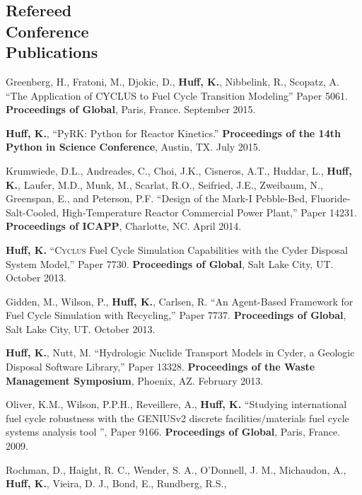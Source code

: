 \documentclass[margin,line]{resume}
\newcommand{\Cyclus}{\textsc{Cyclus}\xspace}%
\begin{document}
\begin{resume}
    \section{\mysidestyle Refereed\\Conference\\Publications}
    \begin{bibenum}
      \item Greenberg, H., Fratoni, M., Djokic, D., \textbf{Huff, K.},
         Nibbelink, R., Scopatz, A. ``The Application of CYCLUS to Fuel Cycle
         Transition Modeling'' Paper 5061.
         \textbf{Proceedings of Global}, Paris, France. September 2015.
      \item \textbf{Huff, K.}, ``PyRK: Python for Reactor Kinetics.''
         \textbf{Proceedings of the 14th Python in Science Conference}, Austin,
         TX. July 2015.
      \item Krumwiede, D.L., Andreades, C., Choi, J.K., Cisneros, A.T., Huddar, L.,
         \textbf{Huff, K.}, Laufer, M.D., Munk, M., Scarlat, R.O., Seifried, J.E.,
         Zweibaum, N., Greenspan, E., and Peterson, P.F.  ``Design of the Mark-I
         Pebble-Bed, Fluoride-Salt-Cooled, High-Temperature Reactor Commercial Power
         Plant,'' Paper 14231.  \textbf{Proceedings of ICAPP}, Charlotte, NC. April 2014.
      \item \textbf{Huff, K.} ``\Cyclus Fuel Cycle Simulation Capabilities with the Cyder Disposal System Model,'' Paper 7730.
         \textbf{Proceedings of Global}, Salt Lake City, UT. October 2013.
      \item Gidden, M., Wilson, P., \textbf{Huff, K.}, Carlsen, R. ``An Agent-Based Framework for Fuel Cycle Simulation with Recycling,'' Paper 7737.
         \textbf{Proceedings of Global}, Salt Lake City, UT. October 2013.
      \item \textbf{Huff, K.}, Nutt, M. ``Hydrologic Nuclide Transport Models in Cyder, a Geologic Disposal Software Library,'' Paper 13328.
         \textbf{Proceedings of the Waste Management Symposium}, Phoenix, AZ.  February 2013.
      \item Oliver, K.M., Wilson, P.P.H., Reveillere, A., \textbf{Huff, K.} ``Studying international fuel cycle robustness with the GENIUSv2 discrete
          facilities/materials fuel cycle systems analysis tool	'', Paper 9166.
          \textbf{Proceedings of Global}, Paris, France. 2009.
      \item Rochman, D., Haight, R. C., Wender, S. A., O'Donnell, J. M.,
        Michaudon, A., \textbf{Huff, K.}, Vieira, D. J., Bond, E., Rundberg, R.S.,

\end{bibenum}
\end{resume}
\end{document}
